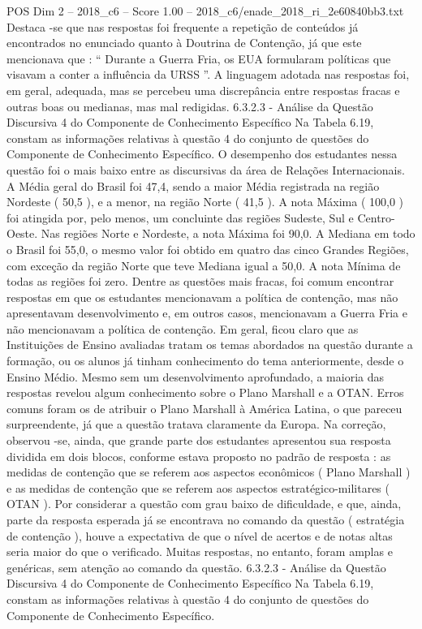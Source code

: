 \begin{textsample}{POS Dim 2 – 2018\_c6 – Score 1.00 – 2018\_c6/enade\_2018\_ri\_2e60840bb3.txt}
Destaca -se que nas respostas foi frequente a repetição de conteúdos já encontrados no enunciado quanto à Doutrina de Contenção, já que este mencionava que : “ Durante a Guerra Fria, os EUA formularam políticas que visavam a conter a influência da URSS ”.
A linguagem adotada nas respostas foi, em geral, adequada, mas se percebeu uma discrepância entre respostas fracas e outras boas ou medianas, mas mal redigidas. 6.3.2.3 - Análise da Questão Discursiva 4 do Componente de Conhecimento Específico Na Tabela 6.19, constam as informações relativas à questão 4 do conjunto de questões do Componente de Conhecimento Específico.
O desempenho dos estudantes nessa questão foi o mais baixo entre as discursivas da área de Relações Internacionais.
A Média geral do Brasil foi 47,4, sendo a maior Média registrada na região Nordeste ( 50,5 ), e a menor, na região Norte ( 41,5 ).
A nota Máxima ( 100,0 ) foi atingida por, pelo menos, um concluinte das regiões Sudeste, Sul e Centro-Oeste.
Nas regiões Norte e Nordeste, a nota Máxima foi 90,0.
A Mediana em todo o Brasil foi 55,0, o mesmo valor foi obtido em quatro das cinco Grandes Regiões, com exceção da região Norte que teve Mediana igual a 50,0.
A nota Mínima de todas as regiões foi zero.
Dentre as questões mais fracas, foi comum encontrar respostas em que os estudantes mencionavam a política de contenção, mas não apresentavam desenvolvimento e, em outros casos, mencionavam a Guerra Fria e não mencionavam a política de contenção.
Em geral, ficou claro que as Instituições de Ensino avaliadas tratam os temas abordados na questão durante a formação, ou os alunos já tinham conhecimento do tema anteriormente, desde o Ensino Médio.
Mesmo sem um desenvolvimento aprofundado, a maioria das respostas revelou algum conhecimento sobre o Plano Marshall e a OTAN.
Erros comuns foram os de atribuir o Plano Marshall à América Latina, o que pareceu surpreendente, já que a questão tratava claramente da Europa.
Na correção, observou -se, ainda, que grande parte dos estudantes apresentou sua resposta dividida em dois blocos, conforme estava proposto no padrão de resposta : as medidas de contenção que se referem aos aspectos econômicos ( Plano Marshall ) e as medidas de contenção que se referem aos aspectos estratégico-militares ( OTAN ).
Por considerar a questão com grau baixo de dificuldade, e que, ainda, parte da resposta esperada já se encontrava no comando da questão ( estratégia de contenção ), houve a expectativa de que o nível de acertos e de notas altas seria maior do que o verificado.
Muitas respostas, no entanto, foram amplas e genéricas, sem atenção ao comando da questão. 6.3.2.3 - Análise da Questão Discursiva 4 do Componente de Conhecimento Específico Na Tabela 6.19, constam as informações relativas à questão 4 do conjunto de questões do Componente de Conhecimento Específico.

\end{textsample}
